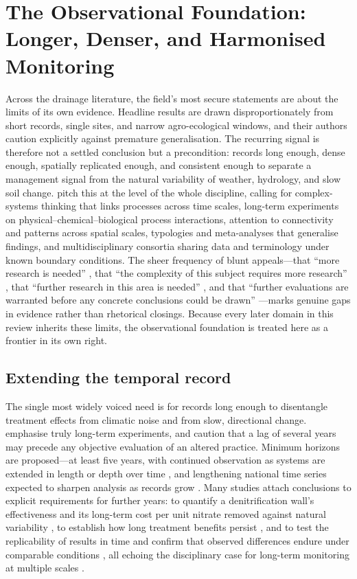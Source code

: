 \documentclass[11pt]{article}
\begin{document}
\section*{The Observational Foundation: Longer, Denser, and Harmonised Monitoring}

Across the drainage literature, the field's most secure statements are
about the limits of its own evidence. Headline results are drawn
disproportionately from short records, single sites, and narrow
agro-ecological windows, and their authors caution explicitly against
premature generalisation. The recurring signal is therefore not a settled
conclusion but a precondition: records long enough, dense enough,
spatially replicated enough, and consistent enough to separate a
management signal from the natural variability of weather, hydrology, and
slow soil change. \textcite{Rogger2017} pitch this at the level of the
whole discipline, calling for complex-systems thinking that links
processes across time scales, long-term experiments on
physical--chemical--biological process interactions, attention to
connectivity and patterns across spatial scales, typologies and
meta-analyses that generalise findings, and multidisciplinary consortia
sharing data and terminology under known boundary conditions. The sheer
frequency of blunt appeals---that ``more research is needed''
\parencite{SHALIT1995}, that ``the complexity of this subject requires more
research'' \parencite{Malone2014}, that ``further research in this area is
needed'' \parencite{Woo2023}, and that ``further evaluations are warranted
before any concrete conclusions could be drawn''
\parencite{GUPTA1993}---marks genuine gaps in evidence rather than
rhetorical closings. Because every later domain in this review inherits
these limits, the observational foundation is treated here as a frontier
in its own right.

\subsection{Extending the temporal record}

The single most widely voiced need is for records long enough to
disentangle treatment effects from climatic noise and from slow,
directional change. \textcite{Clifford2023} emphasise truly long-term
experiments, and \textcite{BUHLER1993} caution that a lag of several years
may precede any objective evaluation of an altered practice. Minimum
horizons are proposed---at least five years, with continued observation as
systems are extended in length or depth over time \parencite{Ali2013}, and
lengthening national time series expected to sharpen analysis as records
grow \parencite{Ali2001}. Many studies attach conclusions to explicit
requirements for further years: to quantify a denitrification wall's
effectiveness and its long-term cost per unit nitrate removed against
natural variability \parencite{Jaynes2008}, to establish how long treatment
benefits persist \parencite{Dalhem2019,Osterholm2005}, and to test the
replicability of results in time and confirm that observed differences
endure under comparable conditions
\parencite{ROLLIN1987,Reinhart2020,Rijal2012,GiménezValero2025}, all
echoing the disciplinary case for long-term monitoring at multiple scales
\parencite{SPALING1995}.
\end{document}
